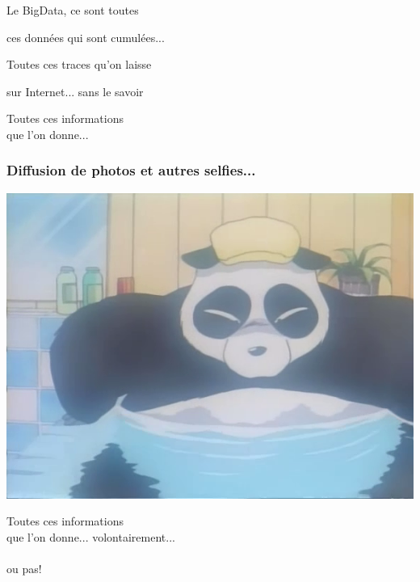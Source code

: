 \documentclass{beamer}
\begin{document}
\begin{frame}
\Huge{\centerline{Le BigData, ce sont toutes}}
\Huge{\centerline{ces données qui sont cumulées...}}
\end{frame}

\begin{frame}
\Huge{\centerline{Toutes ces traces qu'on laisse}}
\Huge{\centerline{sur Internet... sans le savoir}}
\end{frame}

\begin{frame}
\begin{center}
\Huge{Toutes ces informations \\ que l'on donne... }
\end{center}
\end{frame}

\begin{frame}
\frametitle{Diffusion de photos et autres selfies...}
\begin{center}
\includegraphics[scale=0.5] {./images/Leak02.png} 
\end{center}
\end{frame}


\begin{frame}
\begin{center}
\Huge{Toutes ces informations \\ que l'on donne... }
\Huge{volontairement...\\~\\ou pas!}
\end{center}
\end{frame}
\end{document}
